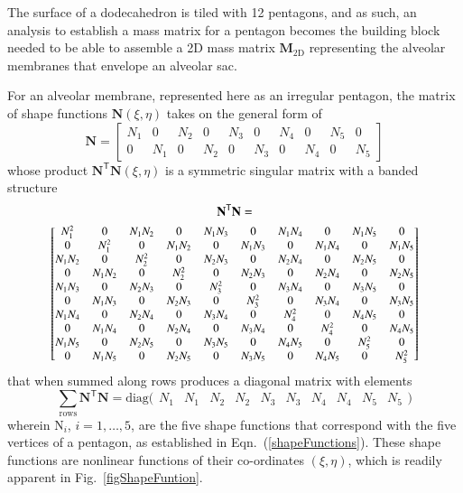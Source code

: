 The surface of a dodecahedron is tiled with 12 pentagons, and as such, an analysis to establish a mass matrix for a pentagon becomes the building block needed to be able to assemble a 2D mass matrix $\mathbf{M}_{\mathrm{2D}}$ representing the alveolar membranes that envelope an alveolar sac.

For an alveolar membrane, represented here as an irregular pentagon, the matrix of shape functions $\mathbf{N}(\xi,\eta)$ takes on the general form of
\begin{equation}
\mathbf{N} = 
\begin{bmatrix}
N_1 & 0 & N_2 & 0 & N_3 & 0 & N_4 & 0 & N_5 & 0 \\ 
0 & N_1 & 0 & N_2 & 0 & N_3 & 0 & N_4 & 0 & N_5 
\end{bmatrix} 
\label{shape2D}
\end{equation}
whose product $\mathbf{N}^{\mathsf{T}}\mathbf{N}(\xi,\eta)$ is a symmetric singular matrix with a banded structure
\begin{multline}
     \mathbf{N}^{\mathsf{T}} \mathbf{N} = \\ \footnotesize \begin{bmatrix}
     N_1^2 & 0 & N_1 N_2 & 0 & N_1 N_3 & 0 & N_1 N_4 & 0 & N_1 N_5 & 0 \\
     0 & N_1^2 & 0 & N_1 N_2 & 0 & N_1 N_3 & 0 & N_1 N_4 & 0 & N_1 N_5 \\
     N_1 N_2 & 0 & N_2^2 & 0 & N_2 N_3 & 0 & N_2 N_4 & 0 & N_2 N_5 & 0 \\
     0 & N_1 N_2 & 0 & N_2^2 & 0 & N_2 N_3 & 0 & N_2 N_4 & 0 & N_2 N_5 \\
     N_1 N_3 & 0 & N_2 N_3 & 0 & N_3^2 & 0 & N_3 N_4 & 0 & N_3 N_5 & 0 \\
     0 & N_1 N_3 & 0 & N_2 N_3 & 0 & N_3^2 & 0 & N_3 N_4 & 0 & N_3 N_5 \\
     N_1 N_4 & 0 & N_2 N_4 & 0 & N_3 N_4 & 0 & N_4^2 & 0 & N_4 N_5 & 0 \\
     0 & N_1 N_4 & 0 & N_2 N_4 & 0 & N_3 N_4 & 0 & N_4^2 & 0 & N_4 N_5 \\
     N_1 N_5 & 0 & N_2 N_5 & 0 & N_3 N_5 & 0 & N_4 N_5 & 0 & N_5^2 & 0 \\
     0 & N_1 N_5 & 0 & N_2 N_5 & 0 & N_3 N_5 & 0 & N_4 N_5 & 0 & N_5^2
     \end{bmatrix}
\end{multline}
\normalsize
that when summed along rows produces a diagonal matrix with elements
\begin{equation}
    \sum_{\mathrm{rows}} \mathbf{N}^{\mathsf{T}} \mathbf{N} = 
    \mathrm{diag} \bigl( \begin{matrix}
    N_1 & N_1 & N_2 & N_2 & N_3 & N_3 & N_4 & N_4 & N_5 & N_5
    \end{matrix} \bigr)
\end{equation}
wherein $\mathrm{N}_i$, $i = 1, \ldots, 5$, are the five shape functions that correspond with the five vertices of a pentagon, as established in Eqn.~(\ref{shapeFunctions}).  These shape functions are nonlinear functions of their co-ordinates $(\xi,\eta)$, which is readily apparent in Fig.~\ref{figShapeFuntion}.


